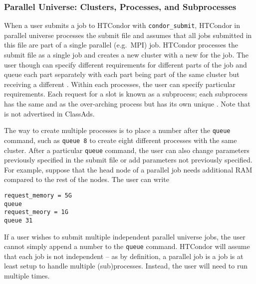 \subsubsection*{\label{sec:Configure-Clusters-Processes-Subprocesses}
Parallel Universe: Clusters, Processes, and Subprocesses} 

When 
a user submits a job to HTCondor with \verb=condor_submit=, HTCondor in parallel 
universe processes the submit file and assumes that all jobs submitted in this 
file are part of a single parallel (e.g.~MPI) job. HTCondor processes the submit 
file as a single job and
creates a new cluster with a new  for the job. The user though can 
specify different requirements for different parts of the job and queue each 
part separately with each part being part of the same cluster but receiving a 
different . Within each processes, the user can specify particular
requirements.
Each request for a slot is known as a subprocess; each subprocess has the same 
 and  as the over-arching process but has its 
own unique 
. Note that  is not advertised in ClassAds.

The way to create multiple processes is to place a number after the \verb=queue= 
command, such as \verb=queue 8= to create eight different processes with the 
same cluster. After a particular \verb=queue= command, the user can also change 
parameters previously specified in the submit file or add parameters not 
previously specified. For example, suppose that the head node of a parallel job 
needs additional RAM compared to the rest of the nodes. The user can write

\begin{verbatim}
request_memory = 5G
queue
request_meory = 1G
queue 31
\end{verbatim}

If a user wishes to submit multiple independent parallel universe jobs, the 
user cannot simply append a number to the \verb=queue= command. HTCondor will 
assume that each job is not independent -- as by definition, a parallel job is a 
job is at least setup to handle multiple (sub)processes. Instead, the user will
need to run  multiple times.

